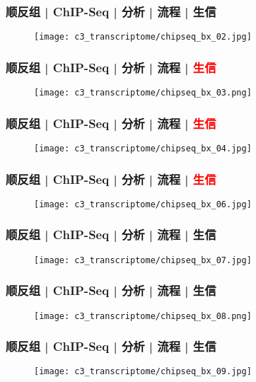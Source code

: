 \begin{frame}
  \frametitle{顺反组 | ChIP-Seq | 分析 | 流程 | 生信}
  \begin{figure}
    \centering
    \texttt{[image: c3\_transcriptome/chipseq\_bx\_02.jpg]}
  \end{figure}
\end{frame}

\begin{frame}
  \frametitle{顺反组 | ChIP-Seq | 分析 | 流程 | \textcolor{red}{生信}}
  \begin{figure}
    \centering
    \texttt{[image: c3\_transcriptome/chipseq\_bx\_03.png]}
  \end{figure}
\end{frame}

\begin{frame}
  \frametitle{顺反组 | ChIP-Seq | 分析 | 流程 | \textcolor{red}{生信}}
  \begin{figure}
    \centering
    \texttt{[image: c3\_transcriptome/chipseq\_bx\_04.jpg]}
  \end{figure}
\end{frame}

\begin{frame}
  \frametitle{顺反组 | ChIP-Seq | 分析 | 流程 | \textcolor{red}{生信}}
  \begin{figure}
    \centering
    \texttt{[image: c3\_transcriptome/chipseq\_bx\_06.jpg]}
  \end{figure}
\end{frame}

\begin{frame}
  \frametitle{顺反组 | ChIP-Seq | 分析 | 流程 | 生信}
  \begin{figure}
    \centering
    \texttt{[image: c3\_transcriptome/chipseq\_bx\_07.jpg]}
  \end{figure}
\end{frame}

\begin{frame}
  \frametitle{顺反组 | ChIP-Seq | 分析 | 流程 | 生信}
  \begin{figure}
    \centering
    \texttt{[image: c3\_transcriptome/chipseq\_bx\_08.png]}
  \end{figure}
\end{frame}

\begin{frame}
  \frametitle{顺反组 | ChIP-Seq | 分析 | 流程 | 生信}
  \begin{figure}
    \centering
    \texttt{[image: c3\_transcriptome/chipseq\_bx\_09.jpg]}
  \end{figure}
\end{frame}

